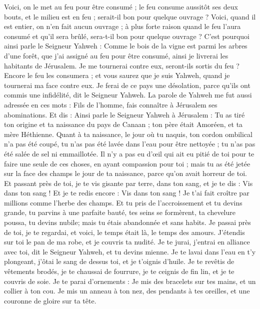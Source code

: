 \begin{multicols}{2}
Voici, on le met au feu pour être consumé ; le feu consume aussitôt ses deux bouts, et le milieu est en feu ; serait-il bon pour quelque ouvrage ?
Voici, quand il est entier, on n'en fait aucun ouvrage ; à plus forte raison quand le feu l'aura consumé et qu'il sera brûlé, sera-t-il bon pour quelque ouvrage ?
C'est pourquoi ainsi parle le Seigneur Yahweh : Comme le bois de la vigne est parmi les arbres d'une forêt, que j'ai assigné au feu pour être consumé, ainsi je livrerai les habitants de Jérusalem.
Je me tournerai contre eux, seront-ils sortis du feu ? Encore le feu les consumera ; et vous saurez que je suis Yahweh, quand je tournerai ma face contre eux.
Je ferai de ce pays une désolation, parce qu'ils ont commis une infidélité, dit le Seigneur Yahweh.
\VerseOne{}La parole de Yahweh me fut aussi adressée en ces mots :
Fils de l'homme, fais connaître à Jérusalem ses abominations.
Et dis : Ainsi parle le Seigneur Yahweh à Jérusalem : Tu as tiré ton origine et ta naissance du pays de Canaan ; ton père était Amoréen, et ta mère Héthienne.
Quant à ta naissance, le jour où tu naquis, ton cordon ombilical n'a pas été coupé, tu n'as pas été lavée dans l'eau pour être nettoyée ; tu n'as pas été salée de sel ni emmaillotée.
Il n'y a pas eu d'œil qui ait eu pitié de toi pour te faire une seule de ces choses, en ayant compassion pour toi ; mais tu as été jetée sur la face des champs le jour de ta naissance, parce qu'on avait horreur de toi.
Et passant près de toi, je te vis gisante par terre, dans ton sang, et je te dis : Vis dans ton sang ! Et je te redis encore : Vis dans ton sang !
Je t'ai fait croître par millions comme l'herbe des champs. Et tu pris de l'accroissement et tu devins grande, tu parvins à une parfaite bauté, tes seins se formèrent, ta chevelure poussa, tu devins nubile; mais tu étais abandonnée et sans habits.
Je passai près de toi, je te regardai, et voici, le temps était là, le temps des amours. J'étendis sur toi le pan de ma robe, et je couvris ta nudité. Je te jurai, j'entrai en alliance avec toi, dit le Seigneur Yahweh, et tu devins mienne.
Je te lavai dans l'eau en t'y plongeant, j'ôtai le sang de dessus toi, et je t'oignis d'huile.
Je te revêtis de vêtements brodés, je te chaussai de fourrure, je te ceignis de fin lin, et je te couvris de soie.
Je te parai d'ornements : Je mis des bracelets sur tes mains, et un collier à ton cou.
Je mis un anneau à ton nez, des pendants à tes oreilles, et une couronne de gloire sur ta tête.

\end{multicols}
